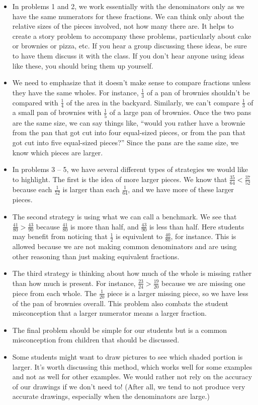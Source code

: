 \documentclass[nooutcomes,noauthor, handout]{ximera}
\begin{document}
\begin{instructorNotes}
\begin{itemize}
	\item In problems 1 and 2, we work essentially with the denominators only as we have the same numerators for these fractions. We can think only about the relative sizes of the pieces involved, not how many there are. It helps to create a story problem to accompany these problems, particularly about cake or brownies or pizza, etc. If you hear a group discussing these ideas, be sure to have them discuss it with the class. If you don't hear anyone using ideas like these, you should bring them up yourself.
	\item We need to emphasize that it doesn't make sense to compare fractions unless they have the same wholes. For instance, $\frac13$ of a pan of brownies shouldn't be compared with $\frac14$ of the area in the backyard. Similarly, we can't compare $\frac13$ of a small pan of brownies with $\frac15$ of a large pan of brownies. Once the two pans are the same size, we can say things like, ``would you rather have a brownie from the pan that got cut into four equal-sized pieces, or from the pan that got cut into five equal-sized pieces?'' Since the pans are the same size, we know which pieces are larger.
	\item In problems 3 -- 5, we have several different types of strategies we would like to highlight. The first is the idea of more larger pieces. We know that $\frac{35}{64} < \frac{37}{52}$ because each $\frac{1}{52}$ is larger than each $\frac{1}{64}$, and we have more of these larger pieces.
	\item The second strategy is using what we can call a benchmark. We see that $\frac{41}{80} > \frac{43}{90}$ because $\frac{41}{80}$ is more than half, and $\frac{43}{90}$ is less than half. Here students may benefit from noticing that $\frac{1}{2}$ is equivalent to $\frac{40}{80}$, for instance. This is allowed because we are not making common denominators and are using other reasoning than just making equivalent fractions.
	\item The third strategy is thinking about how much of the whole is missing rather than how much is present. For instance, $\frac{23}{24}>\frac{19}{20}$ because we are missing one piece from each whole. The $\frac{1}{20}$ piece is a larger missing piece, so we have less of the pan of brownies overall. This problem also combats the student misconception that a larger numerator means a larger fraction.
	\item The final problem should be simple for our students but is a common misconception from children that should be discussed.
	\item Some students might want to draw pictures to see which shaded portion is larger. It's worth discussing this method, which works well for some examples and not as well for other examples. We would rather not rely on the accuracy of our drawings if we don't need to! (After all, we tend to not produce very accurate drawings, especially when the denominators are large.)
\end{itemize}





\end{instructorNotes}
\end{document}
